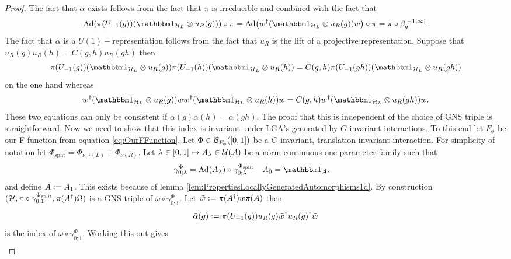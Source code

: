 \documentclass[12pt,a4paper,twoside]{article}
\numberwithin{equation}{section}
\begin{document}
\begin{proof}
	The fact that $\alpha$ exists follows from the fact that $\pi$ is irreducible and combined with the fact that
	\begin{equation}
		\Ad{\pi(U_{-1}(g)) (\id_{\HH_L}\otimes u_R(g))}\circ\pi=\Ad{w^\dagger(\id_{\HH_L}\otimes u_R(g)) w}\circ\pi=\pi\circ\beta_g^{[-1,\infty[}.
	\end{equation}
	The fact that $\alpha$ is a $U(1)-$representation follows from the fact that $u_R$ is the lift of a projective representation. Suppose that $u_R(g)u_R(h)=C(g,h)u_R(gh)$ then
	\begin{equation}
		\pi(U_{-1}(g)) (\id_{\HH_L}\otimes u_R(g))\pi(U_{-1}(h)) (\id_{\HH_L}\otimes u_R(h))=C(g,h)\pi(U_{-1}(gh)) (\id_{\HH_L}\otimes u_R(gh))
	\end{equation}
	on the one hand whereas
	\begin{equation}
		w^\dagger(\id_{\HH_L}\otimes u_R(g)) ww^\dagger(\id_{\HH_L}\otimes u_R(h)) w=C(g,h)w^\dagger(\id_{\HH_L}\otimes u_R(gh)) w.
	\end{equation}
	These two equations can only be consistent if $\alpha(g)\alpha(h)=\alpha(gh)$. The proof that this is independent of the choice of GNS triple is straightforward. Now we need to show that this index is invariant under LGA's generated by $G$-invariant interactions. To this end let $F_\phi$ be our F-function from equation \eqref{eq:OurFFunction}. Let $\Phi\in\mathcal B_{F_\phi}([0,1])$ be a $G$-invariant, translation invariant interaction. For simplicity of notation let $\Phi_{\text{split}}=\Phi_{\nu^{-1}(L)}+\Phi_{\nu(R)}$. Let $\lambda\in[0,1]\mapsto A_\lambda\in\mathcal U(\mathcal A)$ be a norm continuous one parameter family such that
	\begin{align}\label{eq:DefinitionSplitting1DAppendix}
		\gamma^\Phi_{0;\lambda}&=\Ad{A_\lambda}\circ\gamma^{\Phi_{\text{split}}}_{0;\lambda}&A_0&=\id_\AA.
	\end{align}
	and define $A\vcentcolon= A_1$. This exists because of lemma \ref{lem:PropertiesLocallyGeneratedAutomorphisms1d}. By construction $(\mathcal H,\pi\circ\gamma^{\Phi_{\text{split}}}_{0;1},\pi(A^\dagger)\Omega)$ is a GNS triple of $\omega\circ\gamma^\Phi_{0;1}$. Let $\tilde{w}\vcentcolon= \pi(A^\dagger)w\pi(A)$ then
	\begin{equation}
		\tilde{\alpha}(g)\vcentcolon= \pi(U_{-1}(g))u_R(g)\tilde{w}^\dagger u_R(g)^\dagger \tilde{w}
	\end{equation}
	is the index of $\omega\circ\gamma^\Phi_{0;1}$. Working this out gives
	\begin{align}

\end{align}
\end{proof}
\end{document}
